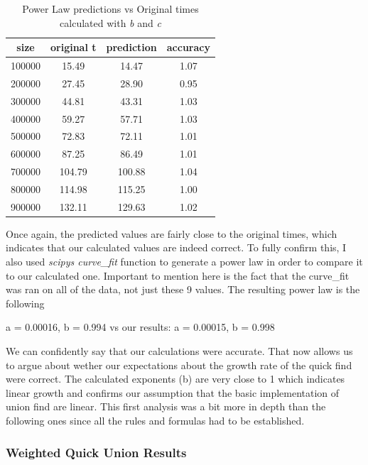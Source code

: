 \documentclass[12pt]{article}
\begin{document}
\begin{table}[h]
    \centering
    \begin{tabular}{|c|c|c|c|}
        \hline size & original t & prediction & accuracy \\
        \hline 100000 & 15.49 & 14.47 & 1.07 \\
        \hline 200000 & 27.45 & 28.90 & 0.95 \\
        \hline 300000 & 44.81 & 43.31 & 1.03 \\
        \hline 400000 & 59.27 & 57.71 & 1.03 \\
        \hline 500000 & 72.83 & 72.11 & 1.01 \\
        \hline 600000 & 87.25 & 86.49 & 1.01 \\
        \hline 700000 & 104.79 & 100.88 & 1.04 \\
        \hline 800000 & 114.98 & 115.25 & 1.00 \\
        \hline 900000 & 132.11 & 129.63 & 1.02 \\
        \hline
    \end{tabular}
    \caption{\small{Power Law predictions vs Original times calculated with \emph{b} and \emph{c}}}
\end{table}

Once again, the predicted values are fairly close to the original times, which indicates
that our calculated values are indeed correct. To fully confirm this, I also used \emph{scipys curve\_fit}
function to generate a power law in order to compare it to our calculated one. Important to mention
here is the fact that the curve\_fit was ran on all of the data, not just these 9 values.  The resulting power law is the following

a = 0.00016, b = 0.994 vs our results: a = 0.00015, b = 0.998

We can confidently say that our calculations were accurate. That now allows us to argue about 
wether our expectations about the growth rate of the quick find were correct. The calculated exponents (b)
are very close to 1 which indicates linear growth and confirms our assumption that the basic implementation
of union find are linear. This first analysis was a bit more in depth than the following ones since
all the rules and formulas had to be established.

\subsubsection{Weighted Quick Union Results}
\end{document}
